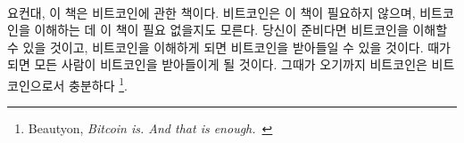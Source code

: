 \paragraph{}
요컨대, 이 책은 비트코인에 관한 책이다. 
비트코인은 이 책이 필요하지 않으며, 비트코인을 이해하는 데 이 책이 필요 없을지도 모른다. 
당신이 준비다면 비트코인을 이해할 수 있을 것이고, 
비트코인을 이해하게 되면 비트코인을 받아들일 수 있을 것이다. 
때가 되면 모든 사람이 비트코인을 받아들이게 될 것이다. 
그때가 오기까지 비트코인은 비트코인으로서 충분하다
\footnote{Beautyon, \textit{Bitcoin is. And that is enough.}~\cite{bitcoin-is}}.


